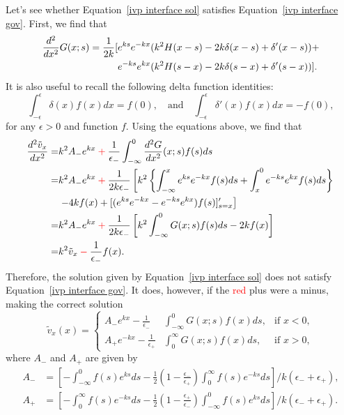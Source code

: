 \documentclass[12pt]{../style-files/ociamthesis}
\begin{document}
Let's see whether Equation~\eqref{ivp interface sol} satisfies Equation~\eqref{ivp interface gov}. First, we find that
\begin{align}
\frac{d^2}{dx^2} G(x;s) = \frac{1}{2k}[& e^{ks}e^{-kx}(k^2H(x-s) - 2k\delta(x-s) + \delta'(x-s)) + \notag \\
& e^{-ks}e^{kx}(k^2H(s-x) - 2k\delta(s-x) + \delta'(s-x))].
\end{align}
It is also useful to recall the following delta function identities:
\begin{equation}
\int_{-\epsilon}^\epsilon \delta(x)f(x) dx = f(0), \quad \text{and} \quad \int_{-\epsilon}^\epsilon \delta'(x)f(x) dx = -f(0),
\end{equation}
for any $\epsilon > 0$ and function $f$. Using the equations above, we find that
\begin{align}
\frac{d^2\tilde{v}_x}{dx^2} = & k^2A_-e^{kx} \: \textcolor{red}{+} \: \frac{1}{\epsilon_-}\int_{-\infty}^0 \frac{d^2G}{dx^2}(x;s) f(s) ds \\
= & k^2A_-e^{kx} \: \textcolor{red}{+} \: \frac{1}{2k\epsilon_-}\left[k^2\left\{\int_{-\infty}^x e^{ks}e^{-kx}f(s) ds  + \int_x^0 e^{-ks}e^{kx}f(s) ds\right\} \right. \\
& \left.- 4kf(x) + [(e^{ks}e^{-kx}-e^{-ks}e^{kx})f(s)]'_{s=x} \right] \\
= & k^2A_-e^{kx} \: \textcolor{red}{+} \: \frac{1}{2k\epsilon_-}\left[k^2\int_{-\infty}^0 G(x;s)f(s) ds - 2kf(x) \right] \\
= & k^2\tilde{v}_x \: \textcolor{red}{-} \: \frac{1}{\epsilon_-}f(x).
\label{ivp interface error}
\end{align}
Therefore, the solution given by Equation~\eqref{ivp interface sol} does not satisfy Equation~\eqref{ivp interface gov}. It does, however, if the \textcolor{red}{red} plus were a minus, making the correct solution 
\begin{equation}
\tilde{v}_x(x) = \left\{
\begin{aligned}
A_-e^{kx} - \frac{1}{\epsilon_-} & \int_{-\infty}^{0} G(x;s)f(x)ds, & \text{if  } x<0,\\
A_+e^{-kx} - \frac{1}{\epsilon_+} & \int_{0}^{\infty} G(x;s)f(x)ds, & \text{if  } x>0,
\end{aligned}
\right.
\label{ivp interface sol correct}
\end{equation}
where $A_-$ and $A_+$ are given by
\begin{align}
A_- & = \left[- \int_{-\infty}^0 f(s)e^{ks} ds - \frac{1}{2}\left(1 - \frac{\epsilon_-}{\epsilon_+}\right)\int_0^\infty f(s)e^{-ks} ds\right] / k(\epsilon_- + \epsilon_+), \\
A_+ & = \left[-\int_0^\infty f(s)e^{-ks} ds - \frac{1}{2}\left(1 - \frac{\epsilon_+}{\epsilon_-}\right)\int_{-\infty}^0 f(s)e^{ks} ds\right] / k(\epsilon_- + \epsilon_+).
\end{align}
\end{document}
